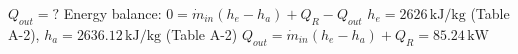 \( Q_{out} = ? \)  
Energy balance: \( 0 = \dot{m}_{in}(h_e - h_a) + Q_R - Q_{out} \)  
\( h_e = 2626 \, \text{kJ/kg} \) (Table A-2), \( h_a = 2636.12 \, \text{kJ/kg} \) (Table A-2)  
\( Q_{out} = \dot{m}_{in}(h_e - h_a) + Q_R = 85.24 \, \text{kW} \)